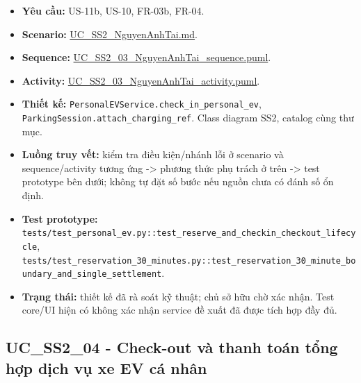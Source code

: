 \documentclass[11pt,a4paper]{article}
\providecommand{\tightlist}{%
  \setlength{\itemsep}{0pt}\setlength{\parskip}{0pt}}
\begin{document}
\begin{itemize}
\tightlist
\item
  \textbf{Yêu cầu:} US-11b, US-10, FR-03b, FR-04.
\item
  \textbf{Scenario:}
  \href{../../../../docs/diagrams/Use-case\%20detail-scenario/SS2/Usecase\%20scenario/UC_SS2_NguyenAnhTai.md}{UC\_SS2\_NguyenAnhTai.md}.
\item
  \textbf{Sequence:}
  \href{../../../../docs/diagrams/Use-case\%20detail-scenario/SS2/Sequence\%20diagrams/UC_SS2_03_NguyenAnhTai_sequence.puml}{UC\_SS2\_03\_NguyenAnhTai\_sequence.puml}.
\item
  \textbf{Activity:}
  \href{../../../../docs/diagrams/Use-case\%20detail-scenario/SS2/Activity\%20diagrams/UC_SS2_03_NguyenAnhTai_activity.puml}{UC\_SS2\_03\_NguyenAnhTai\_activity.puml}.
\item
  \textbf{Thiết kế:} \texttt{PersonalEVService.check\_in\_personal\_ev},
  \texttt{ParkingSession.attach\_charging\_ref}. Class diagram SS2,
  catalog cùng thư mục.
\item
  \textbf{Luồng truy vết:} kiểm tra điều kiện/nhánh lỗi ở scenario và
  sequence/activity tương ứng -\textgreater{} phương thức phụ trách ở
  trên -\textgreater{} test prototype bên dưới; không tự đặt số bước nếu
  nguồn chưa có đánh số ổn định.
\item
  \textbf{Test prototype:}
  \texttt{tests/test\_personal\_ev.py::test\_reserve\_and\_checkin\_checkout\_lifecycle},
  \texttt{tests/test\_reservation\_30\_minutes.py::test\_reservation\_30\_minute\_boundary\_and\_single\_settlement}.
\item
  \textbf{Trạng thái:} thiết kế đã rà soát kỹ thuật; chủ sở hữu chờ xác
  nhận. Test core/UI hiện có không xác nhận service đề xuất đã được tích
  hợp đầy đủ.
\end{itemize}

\hypertarget{uc_ss2_04---check-out-vuxe0-thanh-touxe1n-tux1ed5ng-hux1ee3p-dux1ecbch-vux1ee5-xe-ev-cuxe1-nhuxe2n}{%
\subsection{UC\_SS2\_04 - Check-out và thanh toán tổng hợp dịch vụ xe EV
cá
nhân}\label{uc_ss2_04---check-out-vuxe0-thanh-touxe1n-tux1ed5ng-hux1ee3p-dux1ecbch-vux1ee5-xe-ev-cuxe1-nhuxe2n}}
\end{document}
